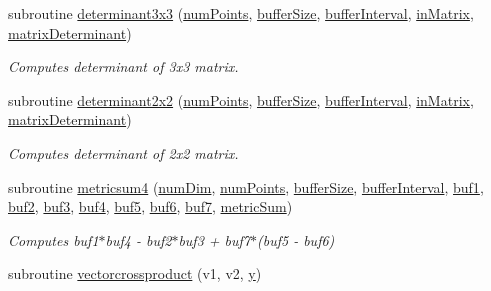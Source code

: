 \begin{DoxyCompactItemize}
\item 
subroutine \hyperlink{namespacespecial_ab519d39d1e9c73cc816de9bac48f1160}{determinant3x3} (\hyperlink{ViscidKernels_8H_adf0bf75d0875d1bb42a5348bee7b7bfd}{num\+Points}, \hyperlink{SpecialKernels_8H_aa9426cdf16e85054db35e88f9b68c6be}{buffer\+Size}, \hyperlink{WENOKernels_8H_ad1001168d5432b52e6d0636f4dc0e60c}{buffer\+Interval}, \hyperlink{SpecialKernels_8H_aacec8fb16540ff8822123643cc0a8ac7}{in\+Matrix}, \hyperlink{SpecialKernels_8H_a78525fd0fb580fe08dba21a167ba4ac1}{matrix\+Determinant})
\begin{DoxyCompactList}\small\item\em Computes determinant of 3x3 matrix. \end{DoxyCompactList}\item 
subroutine \hyperlink{namespacespecial_ac4a36999d6e685473f363175905ad019}{determinant2x2} (\hyperlink{ViscidKernels_8H_adf0bf75d0875d1bb42a5348bee7b7bfd}{num\+Points}, \hyperlink{SpecialKernels_8H_aa9426cdf16e85054db35e88f9b68c6be}{buffer\+Size}, \hyperlink{WENOKernels_8H_ad1001168d5432b52e6d0636f4dc0e60c}{buffer\+Interval}, \hyperlink{SpecialKernels_8H_aacec8fb16540ff8822123643cc0a8ac7}{in\+Matrix}, \hyperlink{SpecialKernels_8H_a78525fd0fb580fe08dba21a167ba4ac1}{matrix\+Determinant})
\begin{DoxyCompactList}\small\item\em Computes determinant of 2x2 matrix. \end{DoxyCompactList}\item 
subroutine \hyperlink{namespacespecial_a35dc32e6088894d25d79ce222235792c}{metricsum4} (\hyperlink{SATKernels_8H_a680185db8546de161968dabace9e94f1}{num\+Dim}, \hyperlink{ViscidKernels_8H_adf0bf75d0875d1bb42a5348bee7b7bfd}{num\+Points}, \hyperlink{SpecialKernels_8H_aa9426cdf16e85054db35e88f9b68c6be}{buffer\+Size}, \hyperlink{WENOKernels_8H_ad1001168d5432b52e6d0636f4dc0e60c}{buffer\+Interval}, \hyperlink{SpecialKernels_8H_a595273dc3902920c0056b8a1ef9bff5e}{buf1}, \hyperlink{SpecialKernels_8H_ab3bc18ad1957d5cb9c2b612e89df900d}{buf2}, \hyperlink{SpecialKernels_8H_abcaabc21103d12066791d03652cf9d07}{buf3}, \hyperlink{SpecialKernels_8H_aa0bc16bfee801837492416db85dff90c}{buf4}, \hyperlink{SpecialKernels_8H_a1d9b2cc88189869440b6641628dea8a9}{buf5}, \hyperlink{SpecialKernels_8H_a1ecfdf27819102af6ccae0762e607308}{buf6}, \hyperlink{SpecialKernels_8H_a8562dabe2a78d45593422b8b1e4ef513}{buf7}, \hyperlink{SpecialKernels_8H_a0340a724362a31a98b845deab71cda83}{metric\+Sum})
\begin{DoxyCompactList}\small\item\em Computes buf1$\ast$buf4 -\/ buf2$\ast$buf3 + buf7$\ast$(buf5 -\/ buf6) \end{DoxyCompactList}\item 
subroutine \hyperlink{namespacespecial_af8feb44102816b409ca0b1d1ea8ae5cc}{vectorcrossproduct} (v1, v2, \hyperlink{SimpleKernels_8H_adbbc84da22c830df0837e7f82eff48d8}{y})
\end{DoxyCompactItemize}
